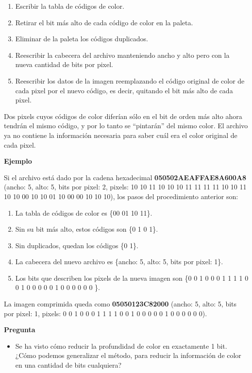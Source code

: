 \documentclass[spanish,a4paper,]{article}
\providecommand{\tightlist}{%
  \setlength{\itemsep}{0pt}\setlength{\parskip}{0pt}}
\begin{document}
\begin{enumerate}
\def\labelenumi{\arabic{enumi}.}
\tightlist
\item
  Escribir la tabla de códigos de color.
\item
  Retirar el bit más alto de cada código de color en la paleta.
\item
  Eliminar de la paleta los códigos duplicados.
\item
  Reescribir la cabecera del archivo manteniendo ancho y alto pero con
  la nueva cantidad de bits por pixel.
\item
  Reescribir los datos de la imagen reemplazando el código original de
  color de cada pixel por el nuevo código, es decir, quitando el bit más
  alto de cada pixel.
\end{enumerate}

Dos pixels cuyos códigos de color diferían sólo en el bit de orden más
alto ahora tendrán el mismo código, y por lo tanto se ``pintarán'' del
mismo color. El archivo ya no contiene la información necesaria para
saber cuál era el color original de cada pixel.

\textbf{Ejemplo}

Si el archivo está dado por la cadena hexadecimal
\textbf{050502AEAFFAE8A600A8} (ancho: 5, alto: 5, bits por pixel: 2,
pixels: 10 10 11 10 10 10 11 11 11 11 10 10 11 10 10 00 10 10 01 10 00
00 10 10 10), los pasos del procedimiento anterior son:

\begin{enumerate}
\def\labelenumi{\arabic{enumi}.}
\tightlist
\item
  La tabla de códigos de color es \{00 01 10 11\}.
\item
  Sin su bit más alto, estos códigos son \{0 1 0 1\}.
\item
  Sin duplicados, quedan los códigos \{0 1\}.
\item
  La cabecera del nuevo archivo es \{ancho: 5, alto: 5, bits por pixel:
  1\}.
\item
  Los bits que describen los pixels de la nueva imagen son \{0 0 1 0 0 0
  1 1 1 1 0 0 1 0 0 0 0 0 1 0 0 0 0 0 0 \}.
\end{enumerate}

La imagen comprimida queda como \textbf{05050123C82000} (ancho: 5, alto:
5, bits por pixel: 1, pixels: 0 0 1 0 0 0 1 1 1 1 0 0 1 0 0 0 0 0 1 0 0
0 0 0 0).

\textbf{Pregunta}

\begin{itemize}
\tightlist
\item
  Se ha visto cómo reducir la profundidad de color en exactamente 1 bit.
  ¿Cómo podemos generalizar el método, para reducir la información de
  color en una cantidad de bits cualquiera?
\end{itemize}
\end{document}
